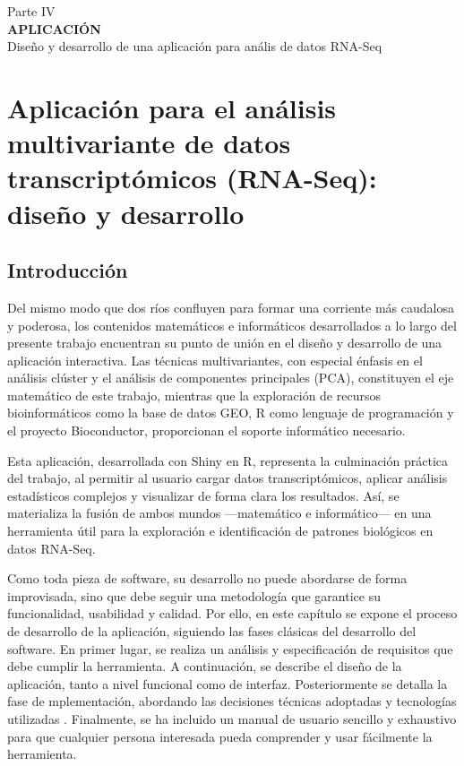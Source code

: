\newpage
\thispagestyle{empty}
\vspace*{\fill}
\begin{center}
    \large Parte IV \\
    \vspace{0.5cm}           
    \LARGE \textbf{APLICACIÓN} \\
    \large Diseño y desarrollo de una aplicación para anális de datos RNA-Seq \\
\end{center}
\vspace*{\fill}
\newpage


\chapter{Aplicación para el análisis multivariante de datos transcriptómicos (RNA-Seq): diseño y desarrollo }
\section{Introducción}

Del mismo modo que dos ríos confluyen para formar una corriente más caudalosa y poderosa, los contenidos matemáticos e informáticos
desarrollados a lo largo del presente trabajo encuentran su punto de unión en el diseño y desarrollo de una aplicación interactiva.
Las técnicas multivariantes, con especial énfasis en el análisis clúster y el análisis de componentes principales (PCA), constituyen 
el eje matemático de este trabajo, mientras que la exploración de recursos bioinformáticos como la base de datos GEO, R como lenguaje 
de programación y el proyecto Bioconductor, proporcionan el soporte informático necesario. \newline

Esta aplicación, desarrollada con Shiny en R, representa la culminación práctica del trabajo, al permitir al usuario cargar datos transcriptómicos, 
aplicar análisis estadísticos complejos y visualizar de forma clara los resultados. Así, se materializa la fusión de ambos mundos —matemático 
e informático— en una herramienta útil para la exploración e identificación de patrones biológicos en datos RNA-Seq. \newline

Como toda pieza de software, su desarrollo no puede abordarse de forma improvisada, sino que debe seguir una metodología que garantice su
funcionalidad, usabilidad y calidad. Por ello, en este capítulo se expone el proceso de desarrollo de la aplicación, siguiendo las fases
clásicas del desarrollo del software. En primer lugar, se realiza un análisis y especificación de requisitos que debe cumplir la herramienta. 
A continuación, se describe el diseño de la aplicación, tanto a nivel funcional como de interfaz. Posteriormente se detalla la fase de mplementación,
abordando las decisiones técnicas adoptadas y tecnologías utilizadas \cite{software}. Finalmente, se ha incluido un manual de usuario sencillo y exhaustivo para
que cualquier persona interesada pueda comprender y usar fácilmente la herramienta.

